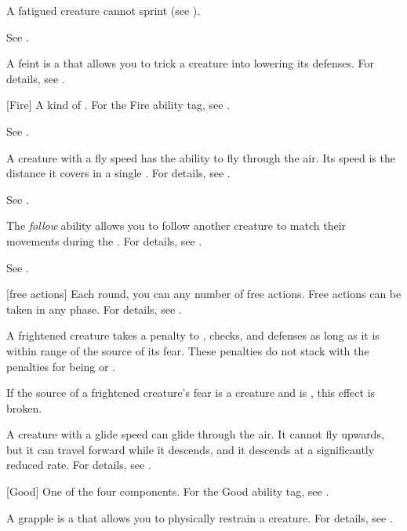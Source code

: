  A fatigued creature cannot sprint (see ).

 See .

 A feint is a  that allows you to trick a creature into lowering its defenses.
For details, see .

[Fire] A kind of . For the Fire ability tag, see .

 See .

 A creature with a fly speed has the ability to fly through the air.
Its speed is the distance it covers in a single .
For details, see .

 See .

 The \textit{follow} ability allows you to follow another creature to match their movements during the .
For details, see .

 See .

[free actions] Each round, you can any number of free actions.
Free actions can be taken in any phase.
For details, see .

 A frightened creature takes a  penalty to , checks, and defenses as long as it is within \rngmed range of the source of its fear.
These penalties do not stack with the penalties for being \shaken or \panicked.

If the source of a frightened creature's fear is a creature and is , this effect is broken.

 A creature with a glide speed can glide through the air.
It cannot fly upwards, but it can travel forward while it descends, and it descends at a significantly reduced rate.
For details, see .

[Good] One of the four  components. For the Good ability tag, see .

 A grapple is a  that allows you to physically restrain a creature.
For details, see .

